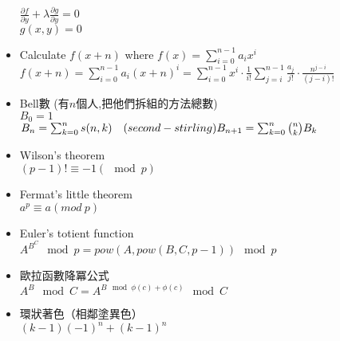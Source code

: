 \begin{itemize}
    $\frac{\partial f}{\partial y} + \lambda\frac{\partial g}{\partial y}=0$\\
    $g(x, y)=0$
  \item Calculate $f(x+n)$ where $f(x)=\sum\limits_{i=0}^{n-1}a_ix^i$\\
    $f(x+n)=\sum\limits_{i=0}^{n-1}a_i(x+n)^i=\sum\limits_{i=0}^{n-1}x^i\cdot\frac{1}{i!}\sum\limits_{j=i}^{n-1}\frac{a_j}{j!}\cdot\frac{n^{j-i}}{(j-i)!}$
  \item Bell數 (有$n$個人,把他們拆組的方法總數)\\
    $B_0= 1$\\
    $B_n= \sum_{k=0}^{n} s(n,k)\quad (second-stirling)\\
    B_{n+1}= \sum_{k=0}^{n}{n \choose k} B_k$
  \item Wilson's theorem\\
    $(p-1)! \equiv -1 (\mod p)$
  \item Fermat's little theorem\\
    $a^p \equiv a (mod \ p)$
  \item Euler's totient function\\
    $ A^{B^C} \mod p=pow(A,pow(B,C,p-1)) \mod p$
  \item 歐拉函數降冪公式\\
    $A^B \mod C=A^{B \mod \phi(c) + \phi(c)}\mod C$
  \item 環狀著色（相鄰塗異色）\\
      $(k-1)(-1)^n+(k-1)^n$
  
\end{itemize}